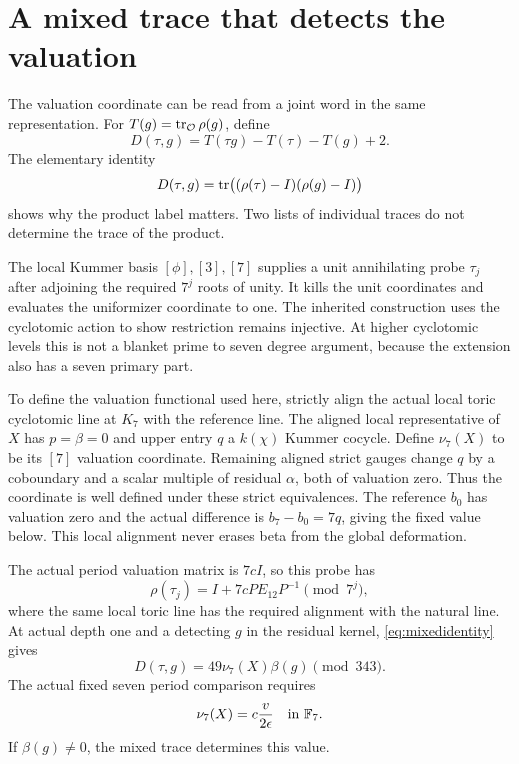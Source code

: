 \section{A mixed trace that detects the valuation}\label{sec:mixedtrace}
The valuation coordinate can be read from a joint word in the same representation. For $T(g)=\operatorname{tr}_{\mathcal O}\rho(g)$, define
\[
D(\tau,g)=T(\tau g)-T(\tau)-T(g)+2.
\]
The elementary identity
\begin{equation}\label{eq:mixedidentity}
D(\tau,g)=\operatorname{tr}\bigl((\rho(\tau)-I)(\rho(g)-I)\bigr)
\end{equation}
shows why the product label matters. Two lists of individual traces do not determine the trace of the product.

The local Kummer basis $[\phi],[3],[7]$ supplies a unit annihilating probe $\tau_j$ after adjoining the required $7^j$ roots of unity. It kills the unit coordinates and evaluates the uniformizer coordinate to one. The inherited construction uses the cyclotomic action to show restriction remains injective. At higher cyclotomic levels this is not a blanket prime to seven degree argument, because the extension also has a seven primary part.

To define the valuation functional used here, strictly align the actual local toric cyclotomic line at $K_7$ with the reference line. The aligned local representative of $X$ has $p=\beta=0$ and upper entry $q$ a $k(\chi)$ Kummer cocycle. Define $\nu_7(X)$ to be its $[7]$ valuation coordinate. Remaining aligned strict gauges change $q$ by a coboundary and a scalar multiple of residual $\alpha$, both of valuation zero. Thus the coordinate is well defined under these strict equivalences. The reference $b_0$ has valuation zero and the actual difference is $b_7-b_0=7q$, giving the fixed value below. This local alignment never erases beta from the global deformation.

The actual period valuation matrix is $7cI$, so this probe has
\[
\rho(\tau_j)=I+7cPE_{12}P^{-1}\pmod{7^j},
\]
where the same local toric line has the required alignment with the natural line. At actual depth one and a detecting $g$ in the residual kernel, \eqref{eq:mixedidentity} gives
\begin{equation}\label{eq:mixedvalue}
D(\tau,g)=49\nu_7(X)\beta(g)\pmod{343}.
\end{equation}
The actual fixed seven period comparison requires
\[
\nu_7(X)=c\frac{v}{2\epsilon}\quad\text{in }\mathbb F_7.
\]
If $\beta(g)\ne0$, the mixed trace determines this value.

